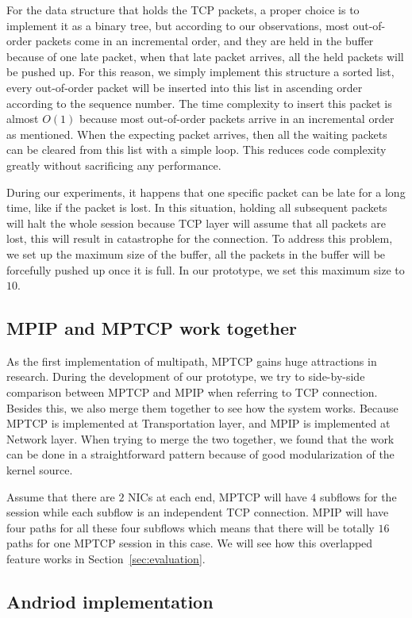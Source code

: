 For the data structure that holds the TCP packets, a proper choice is to implement it as a binary tree, but according to our observations, most out-of-order packets come in an incremental order, and they are held in the buffer because of one late packet, when that late packet arrives, all the held packets will be pushed up. For this reason, we simply implement this structure a sorted list, every out-of-order packet will be inserted into this list in ascending order according to the sequence number. The time complexity to insert this packet is almost $O(1)$ because most out-of-order packets arrive in an incremental order as mentioned.
When the expecting packet arrives, then all the waiting packets can be cleared from this list with a simple loop. This reduces code complexity greatly without sacrificing any performance.

During our experiments, it happens that one specific packet can be late for a long time, like if the packet is lost. In this situation, holding all subsequent packets will halt the whole session because TCP layer will assume that all packets are lost, this will result in catastrophe for the connection. To address this problem, we set up the maximum size of the buffer, all the packets in the buffer will be forcefully pushed up once it is full. In our prototype, we set this maximum size to $10$.

\subsection{MPIP and MPTCP work together}
As the first implementation of multipath, MPTCP gains huge attractions in research. During the development of our prototype, we try to side-by-side comparison between MPTCP and MPIP when referring to TCP connection. Besides this, we also merge them together to see how the system works. Because MPTCP is implemented at Transportation layer, and MPIP is implemented at Network layer. When trying to merge the two together, we found that the work can be done in a straightforward pattern because of good modularization of the kernel source. 

Assume that there are $2$ NICs at each end, MPTCP will have $4$ subflows for the session while each subflow is an independent TCP connection. MPIP will have four paths for all these four subflows which means that there will be totally $16$ paths for one MPTCP session in this case. We will see how this overlapped feature works in Section~\ref{sec:evaluation}.

\subsection{Andriod implementation}
